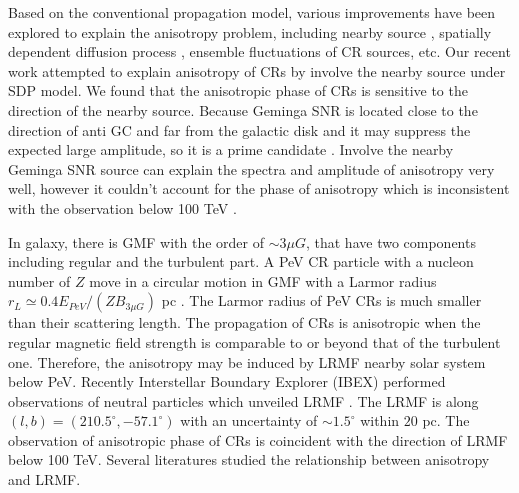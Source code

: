 \documentclass[a4paper,11pt]{article}
\begin{document}
Based on the conventional propagation model, various improvements have been explored to explain the anisotropy problem, including  nearby source \citep {2006APh....25..183E, 2012JCAP...01..010B, 2013APh....50...33S, 2017PhRvD..96b3006L}, spatially dependent diffusion process \citep{2012PhRvL.108u1102E, 2012ApJ...752L..13T, 2016ApJ...819...54G}, ensemble fluctuations of CR sources, etc. 
Our recent work attempted to explain  anisotropy of CRs by involve the nearby  source  under SDP model\citep {2019JCAP...10..010L, 2019JCAP...12..007Q}. We found that  the anisotropic phase of CRs  is sensitive to the direction of the nearby source.
Because Geminga SNR is located close to the direction of anti GC and far from the galactic disk and it may suppress the expected large amplitude, so it is a prime candidate \citep {2017Sci...358..911A}. Involve the nearby Geminga SNR source can explain the spectra and amplitude of anisotropy very well, however it couldn't account for the phase of anisotropy which is inconsistent with the observation below 100 TeV \citep {2019JCAP...10..010L}.

In galaxy, there is  GMF  with the order of $ \sim 3\mu G$, that have two components including regular and the turbulent part. A PeV CR particle  with a nucleon number of $Z$ move in a circular motion  in GMF with a Larmor radius $r_L \simeq 0.4  E_{PeV}/(ZB_{3\mu G})$ pc \citep{2016PhRvL.117o1103A, 2017PrPNP..94..184A,  2016MNRAS.457.3975S}.
The Larmor radius of PeV CRs is much smaller than their scattering length.
The propagation of CRs is anisotropic when the regular magnetic field strength is comparable to or beyond that of the turbulent one.
Therefore, the anisotropy  may be induced by LRMF nearby solar system below PeV\citep {2009ApJ...703L..90B}.
Recently Interstellar Boundary Explorer  (IBEX) performed observations of neutral particles which unveiled LRMF \citep {2013ApJ...776...30F}. 
The LRMF is  along $(l,b) = (210.5^\circ,-57.1^\circ)$ with an uncertainty of $\sim 1.5^\circ$  within $20$ pc. The observation of anisotropic phase of CRs is coincident with  the direction of LRMF below 100 TeV.
Several literatures \citep {2014Sci...343..988S, 2015PhRvL.114b1101M, 2016PhRvL.117o1103A, 2020ApJ...892....6L} studied the relationship between anisotropy and LRMF.
\end{document}
